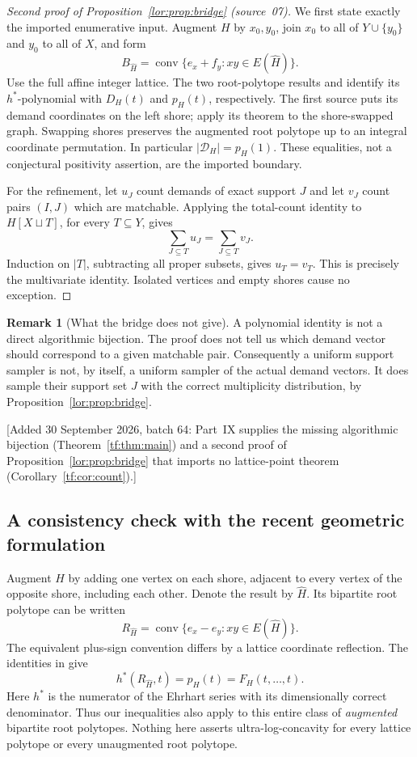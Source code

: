 \documentclass[11pt]{article}
\numberwithin{equation}{section}
\theoremstyle{definition}
\newtheorem{remark}[theorem]{Remark}
\newcommand{\conv}{\operatorname{conv}}
\newcommand{\cD}{\mathcal D}
\begin{document}
\begin{proof}[Second proof of Proposition~\ref{lor:prop:bridge} (source~07)]
We first state exactly the imported enumerative input. Augment $H$ by
$x_0,y_0$, join $x_0$ to all of $Y\cup\{y_0\}$ and $y_0$ to all of $X$, and
form
\[
 B_{\widehat H}=\conv\{e_x+f_y:xy\in E(\widehat H)\}.
\]
Use the full affine integer lattice. The two root-polytope results
\cite[Theorem 1.2]{DHLTW} and \cite[Theorem 3.10]{DK} identify its $h^*$-polynomial
with $D_H(t)$ and $p_H(t)$, respectively. The first source puts its demand
coordinates on the left shore; apply its theorem to the shore-swapped graph.
Swapping shores preserves the augmented root polytope up to an integral
coordinate permutation. In particular
$|\cD_H|=p_H(1)$. These equalities, not a conjectural positivity assertion, are
the imported boundary.

For the refinement, let $u_J$ count demands of exact support $J$ and let $v_J$
count pairs $(I,J)$ which are matchable. Applying the total-count identity to
$H[X\sqcup T]$, for every $T\subseteq Y$, gives
\[
 \sum_{J\subseteq T}u_J=\sum_{J\subseteq T}v_J.
\]
Induction on $|T|$, subtracting all proper subsets, gives $u_T=v_T$. This is
precisely the multivariate identity. Isolated vertices and empty shores cause
no exception.
\end{proof}

\begin{remark}[What the bridge does not give]
A polynomial identity is not a direct algorithmic bijection. The proof does not
tell us which demand vector should correspond to a given matchable pair.
Consequently a uniform support sampler is not, by itself, a uniform sampler
of the actual demand vectors. It does sample their support set $J$ with the
correct multiplicity distribution, by Proposition~\ref{lor:prop:bridge}.
\end{remark}
[Added 30 September 2026, batch 64: Part~IX supplies the missing
algorithmic bijection (Theorem~\ref{tf:thm:main}) and a second proof of
Proposition~\ref{lor:prop:bridge} that imports no lattice-point theorem
(Corollary~\ref{tf:cor:count}).]


\subsection{A consistency check with the recent geometric formulation}
Augment $H$ by adding one vertex on each shore, adjacent to every vertex
of the opposite shore, including each other. Denote the result by
$\widehat H$. Its bipartite root polytope can be written
\[
 R_{\widehat H}=\conv\{e_x-e_y:xy\in E(\widehat H)\}.
\]
The equivalent plus-sign convention differs by a lattice coordinate
reflection. The identities in \cite{OT20,DHLTW} give
\begin{equation}
 h^*(R_{\widehat H},t)=p_H(t)=F_H(t,\ldots,t).
 \label{lor:eq:rootpoly}
\end{equation}
Here $h^*$ is the numerator of the Ehrhart series with its dimensionally
correct denominator. Thus our inequalities also apply to this entire
class of \emph{augmented} bipartite root polytopes. Nothing here asserts
ultra-log-concavity for every lattice polytope or every unaugmented root
polytope.
\end{document}
